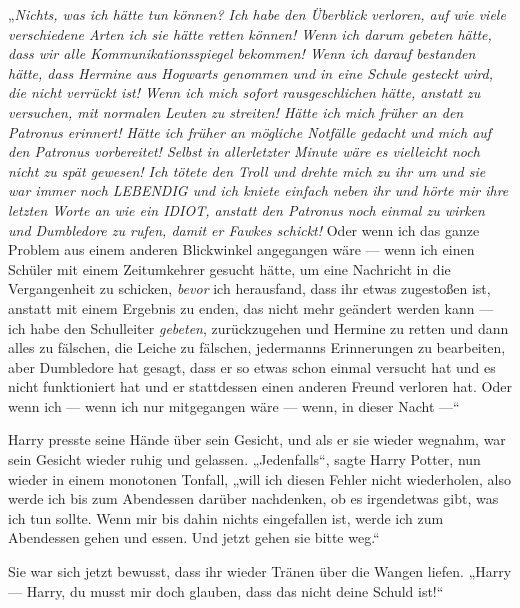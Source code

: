 „\emph{Nichts, was ich hätte \emph{tun} können? Ich habe den Überblick verloren, auf wie viele verschiedene Arten ich sie hätte retten können! Wenn ich darum gebeten hätte, dass wir alle Kommunikationsspiegel bekommen! Wenn ich darauf bestanden hätte, dass Hermine aus Hogwarts genommen und in eine Schule gesteckt wird, die nicht verrückt ist! Wenn ich mich sofort rausgeschlichen hätte, anstatt zu versuchen, mit normalen Leuten zu streiten! Hätte ich mich früher an den Patronus erinnert! Hätte ich früher an mögliche Notfälle gedacht und mich auf den Patronus vorbereitet! Selbst in allerletzter Minute wäre es vielleicht noch nicht zu spät gewesen! Ich tötete den Troll und drehte mich zu ihr um und sie war immer noch LEBENDIG und ich kniete einfach neben ihr und hörte mir ihre letzten Worte an wie ein IDIOT, anstatt den Patronus noch einmal zu wirken und Dumbledore zu rufen, damit er Fawkes schickt!} Oder wenn ich das ganze Problem aus einem anderen Blickwinkel angegangen wäre — wenn ich einen Schüler mit einem Zeitumkehrer gesucht hätte, um eine Nachricht in die Vergangenheit zu schicken, \emph{bevor} ich herausfand, dass ihr etwas zugestoßen ist, anstatt mit einem Ergebnis zu enden, das nicht mehr geändert werden kann — ich habe den Schulleiter \emph{gebeten}, zurückzugehen und Hermine zu retten und dann alles zu fälschen, die Leiche zu fälschen, jedermanns Erinnerungen zu bearbeiten, aber Dumbledore hat gesagt, dass er so etwas schon einmal versucht hat und es nicht funktioniert hat und er stattdessen einen anderen Freund verloren hat. Oder wenn ich — wenn ich nur mitgegangen wäre — wenn, in dieser Nacht —“


Harry presste seine Hände über sein Gesicht, und als er sie wieder wegnahm, war sein Gesicht wieder ruhig und gelassen.
„Jedenfalls“, sagte Harry Potter, nun wieder in einem monotonen Tonfall, „will ich diesen Fehler nicht wiederholen, also werde ich bis zum Abendessen darüber nachdenken, ob es irgendetwas gibt, was ich tun sollte. Wenn mir bis dahin nichts eingefallen ist, werde ich zum Abendessen gehen und essen. Und jetzt gehen sie bitte weg.“

Sie war sich jetzt bewusst, dass ihr wieder Tränen über die Wangen liefen.
„Harry — Harry, du musst mir doch glauben, dass das nicht deine Schuld ist!“

